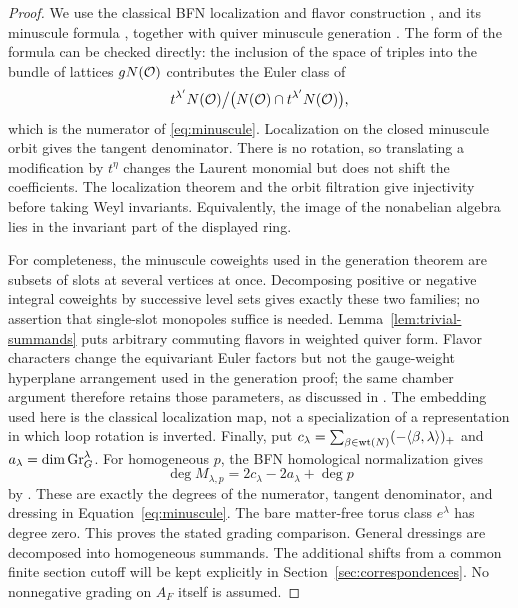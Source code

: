 \begin{proof}
We use the classical BFN localization and flavor construction
\cite[Proposition~3.22, Lemmas~5.9--5.13, Proposition~5.15,
and Corollary~5.21]{BFN18}, and its minuscule formula
\cite[Proposition~6.6]{BFN18}\cite[Appendix~A, Proposition~A.2]{BFN19},
together with quiver minuscule generation
\cite[Proposition~3.1 and Remarks~3.3--3.4]{Weekes19}.
The form of the formula can be checked directly: the inclusion of the
space of triples into the bundle of lattices $gN(\mathcal O)$ contributes the
Euler class of
\[
 t^{\lambda'}N(\mathcal O)\big/
       \bigl(N(\mathcal O)\cap t^{\lambda'}N(\mathcal O)\bigr),
\]
which is the numerator of \eqref{eq:minuscule}.  Localization on the
closed minuscule orbit gives the tangent denominator.  There is no
rotation, so translating a modification by $t^\eta$ changes the Laurent
monomial but does not shift the coefficients.  The localization theorem
and the orbit filtration give injectivity before taking Weyl invariants.
Equivalently, the image of the nonabelian algebra lies in the invariant
part of the displayed ring.

For completeness, the minuscule coweights used in the generation theorem
are subsets of slots at several vertices at once.  Decomposing positive
or negative integral coweights by successive level sets gives exactly
these two families; no assertion that single-slot monopoles suffice is
needed.  Lemma~\ref{lem:trivial-summands} puts arbitrary commuting flavors
in weighted quiver form.  Flavor characters change the equivariant Euler
factors but not the gauge-weight hyperplane arrangement used in the
generation proof; the same chamber argument therefore retains those
parameters, as discussed in \cite[Section~1.6.1]{Weekes19}.
The embedding used here is the classical localization map, not a
specialization of a representation in which loop rotation is inverted.
Finally, put $c_\lambda=\sum_{\beta\in\operatorname{wt}(N)}
(-\langle\beta,\lambda\rangle)_+$ and
$a_\lambda=\dim\operatorname{Gr}_G^\lambda$.  For homogeneous $p$, the BFN homological
normalization gives
\[
 \deg M_{\lambda,p}=2c_\lambda-2a_\lambda+\deg p
\]
by \cite[Lemmas~2.2 and 2.5--2.6]{BFN18}.  These are exactly the degrees
of the numerator, tangent denominator, and dressing in
Equation~\eqref{eq:minuscule}.  The bare matter-free torus class
$e^\lambda$ has degree zero.  This proves the stated grading comparison.
General dressings are decomposed into homogeneous summands.
The additional shifts from a common finite section cutoff will be kept
explicitly in Section~\ref{sec:correspondences}.
No nonnegative grading on $A_F$ itself is assumed.
\end{proof}

